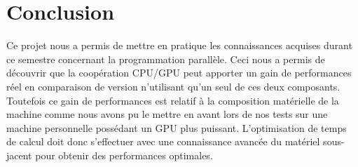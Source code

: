\section*{Conclusion}

	Ce projet nous a permis de mettre en pratique les connaissances acquises durant ce semestre concernant la programmation parallèle. Ceci nous a permis de découvrir que la coopération CPU/GPU peut apporter un gain de performances réel en comparaison de version n'utilisant qu'un seul de ces deux composants.\\
	
	 Toutefois ce gain de performances est relatif à la composition matérielle de la machine comme nous avons pu le mettre en avant lors de nos tests sur une machine personnelle possédant un GPU plus puissant. L'optimisation de temps de calcul doit donc s'effectuer avec une connaissance avancée du matériel sous-jacent pour obtenir des performances optimales.